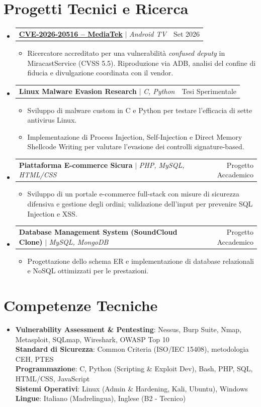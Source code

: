 \documentclass[letterpaper,11pt]{article}
\makeatletter
\newcommand{\resumeItem}[1]{\item\small{{#1\vspace{-2pt}}}}
\newcommand{\resumeProjectHeading}[2]{
  \item
  \begin{tabular*}{0.97\textwidth}{l@{\extracolsep{\fill}}r}
    \small#1 & #2 \\
  \end{tabular*}\vspace{-3pt}
}
\newcommand{\resumeSubHeadingListStart}{\begin{itemize}[leftmargin=0.15in,label={},topsep=3pt,itemsep=4pt,parsep=0pt]}
\newcommand{\resumeSubHeadingListEnd}{\end{itemize}}
\newcommand{\resumeItemListStart}{\begin{itemize}[topsep=3pt,itemsep=2pt,parsep=0pt]}
\newcommand{\resumeItemListEnd}{\end{itemize}\vspace{-5pt}}
\makeatother
\begin{document}
\section{Progetti Tecnici e Ricerca}
\resumeSubHeadingListStart
  \resumeProjectHeading{\textbf{\href{https://dingo97.github.io/it/research/CVE-2026-20516/}{CVE-2026-20516 -- MediaTek}} $|$ \emph{Android TV}}{Set 2026}
    \resumeItemListStart
      \resumeItem{Ricercatore accreditato per una vulnerabilità \emph{confused deputy} in MiracastService (CVSS 5.5). Riproduzione via ADB, analisi del confine di fiducia e divulgazione coordinata con il vendor.}
    \resumeItemListEnd
  \resumeProjectHeading{\textbf{Linux Malware Evasion Research} $|$ \emph{C, Python}}{Tesi Sperimentale}
    \resumeItemListStart
      \resumeItem{Sviluppo di malware custom in C e Python per testare l'efficacia di sette antivirus Linux.}
      \resumeItem{Implementazione di Process Injection, Self-Injection e Direct Memory Shellcode Writing per valutare l'evasione dei controlli signature-based.}
    \resumeItemListEnd
  \resumeProjectHeading{\textbf{Piattaforma E-commerce Sicura} $|$ \emph{PHP, MySQL, HTML/CSS}}{Progetto Accademico}
    \resumeItemListStart
      \resumeItem{Sviluppo di un portale e-commerce full-stack con misure di sicurezza difensiva e gestione degli ordini; validazione dell'input per prevenire SQL Injection e XSS.}
    \resumeItemListEnd
  \resumeProjectHeading{\textbf{Database Management System (SoundCloud Clone)} $|$ \emph{MySQL, MongoDB}}{Progetto Accademico}
    \resumeItemListStart
      \resumeItem{Progettazione dello schema ER e implementazione di database relazionali e NoSQL ottimizzati per le prestazioni.}
    \resumeItemListEnd
\resumeSubHeadingListEnd

\section{Competenze Tecniche}
\begin{itemize}[leftmargin=0.15in,label={},topsep=3pt]
  \small\item{
    \textbf{Vulnerability Assessment \& Pentesting}: Nessus, Burp Suite, Nmap, Metasploit, SQLmap, Wireshark, OWASP Top 10 \\
    \textbf{Standard di Sicurezza}: Common Criteria (ISO/IEC 15408), metodologia CEH, PTES \\
    \textbf{Programmazione}: C, Python (Scripting \& Exploit Dev), Bash, PHP, SQL, HTML/CSS, JavaScript \\
    \textbf{Sistemi Operativi}: Linux (Admin \& Hardening, Kali, Ubuntu), Windows \\
    \textbf{Lingue}: Italiano (Madrelingua), Inglese (B2 - Tecnico)
  }
\end{itemize}
\end{document}
